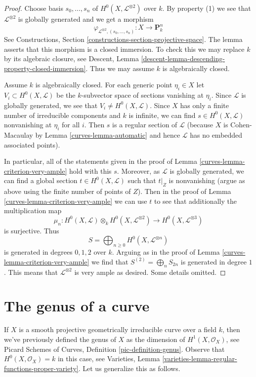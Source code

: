 \begin{proof}

Choose basis $s_0, \ldots, s_n$ of $H^0(X, \mathcal{L}^{\otimes 2})$
over $k$. By property (1) we see that $\mathcal{L}^{\otimes 2}$
is globally generated and we get a morphism
$$
\varphi_{\mathcal{L}^{\otimes 2}, (s_0, \ldots, s_n)} :
X \longrightarrow \mathbf{P}^n_k
$$
See Constructions, Section \ref{constructions-section-projective-space}.
The lemma asserts that this morphism is a closed immersion.
To check this we may replace $k$ by its algebraic closure, see
Descent, Lemma \ref{descent-lemma-descending-property-closed-immersion}.
Thus we may assume $k$ is algebraically closed.

\medskip\noindent
Assume $k$ is algebraically closed. For each generic point $\eta_i \in X$
let $V_i \subset H^0(X, \mathcal{L})$ be the $k$-subvector space of
sections vanishing at $\eta_i$. Since $\mathcal{L}$ is globally generated,
we see that $V_i \not = H^0(X, \mathcal{L})$. Since $X$ has only a
finite number of irreducible components and $k$ is infinite, we can find
$s \in H^0(X, \mathcal{L})$ nonvanishing at $\eta_i$ for all $i$.
Then $s$ is a regular section of $\mathcal{L}$ (because $X$ is
Cohen-Macaulay by Lemma \ref{curves-lemma-automatic} and hence $\mathcal{L}$
has no embedded associated points).

\medskip\noindent
In particular, all of the statements given in the proof of
Lemma \ref{curves-lemma-criterion-very-ample} hold with this $s$.
Moreover, as $\mathcal{L}$ is globally generated, we can find
a global section $t \in H^0(X, \mathcal{L})$ such that
$t|_Z$ is nonvanishing (argue as above using the finite number
of points of $Z$). Then in the proof of Lemma \ref{curves-lemma-criterion-very-ample}
we can use $t$ to see that additionally the multiplication map
$$
\mu_n :
H^0(X, \mathcal{L}) \otimes_k H^0(X, \mathcal{L}^{\otimes 2})
\longrightarrow
H^0(X, \mathcal{L}^{\otimes 3})
$$
is surjective. Thus
$$
S = \bigoplus\nolimits_{n \geq 0} H^0(X, \mathcal{L}^{\otimes n})
$$
is generated in degrees $0, 1, 2$ over $k$. Arguing as in the
proof of Lemma \ref{curves-lemma-criterion-very-ample} we find that
$S^{(2)} = \bigoplus_{n} S_{2n}$ is generated in degree $1$.
This means that $\mathcal{L}^{\otimes 2}$ is very ample as desired.
Some details omitted.
\end{proof}

\section{The genus of a curve}
\label{curves-section-genus}
If $X$ is a smooth projective geometrically irreducible curve over a field $k$,
then we've previously defined the genus of $X$ as the dimension of
$H^1(X, \mathcal{O}_X)$, see
Picard Schemes of Curves, Definition \ref{pic-definition-genus}.
Observe that $H^0(X, \mathcal{O}_X) = k$ in this case, see
Varieties, Lemma \ref{varieties-lemma-regular-functions-proper-variety}.
Let us generalize this as follows.

